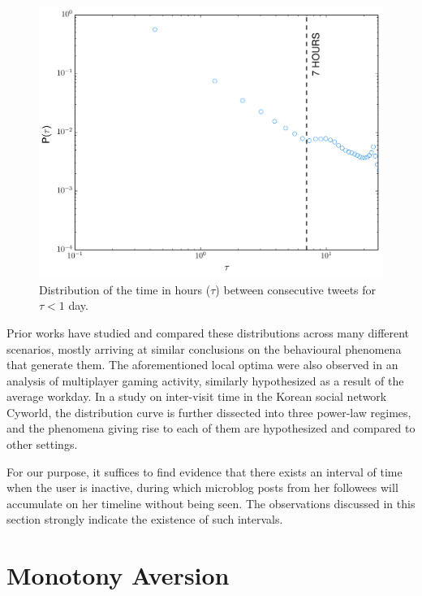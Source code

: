 \documentclass[onesided,asymmetric]{tufte-book}
\begin{document}
\begin{figure}
    \includegraphics[width=\linewidth]{weibo_iet_zoomed}
    \caption[Weibo intertweet time distribution for $\tau < 1$ day.]{Distribution of the time in hours ($\tau$) between consecutive tweets for $\tau < 1$ day.}
    \label{fig:weibo-iet-zoomed}
\end{figure}

Prior works have studied and compared these distributions across many different scenarios, mostly arriving at similar conclusions on the behavioural phenomena that generate them. The aforementioned local optima were also observed in an analysis of multiplayer gaming activity\cite{mryglod2015interevent}, similarly hypothesized as a result of the average workday. In a study on inter-visit time in the Korean social network Cyworld\cite{chun2008comparison}, the distribution curve is further dissected into three power-law regimes, and the phenomena giving rise to each of them are hypothesized and compared to other settings.

For our purpose, it suffices to find evidence that there exists an interval of time when the user is inactive, during which microblog posts from her followees will accumulate on her timeline without being seen. The observations discussed in this section strongly indicate the existence of such intervals.

\newpage

\section{Monotony Aversion}
\end{document}
